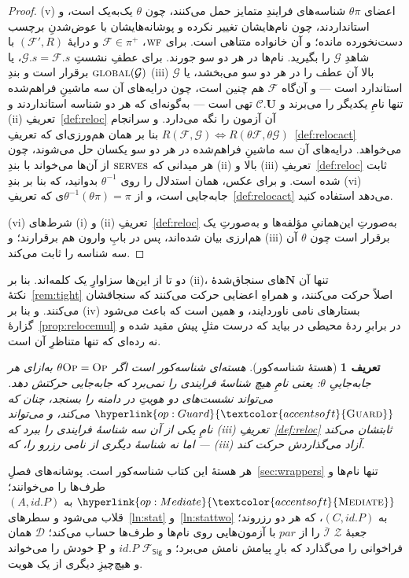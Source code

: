 \documentclass[10pt,oneside,openany]{book}
\newcommand{\Ps}{\mathbf{P}}
\newcommand{\admits}{\mathbf{N}}
\newcommand{\pars}{\mathit{par}}
\newcommand{\uses}{\mathbf{U}}
\newcommand{\serves}{\op{serves}}
\newcommand{\WF}{\op{wf}}
\newcommand{\Corr}{\mathcal{C}}
\newcommand{\F}{\mathcal{F}}
\newcommand{\G}{\mathcal{G}}
\newcommand{\Zenv}{\mathcal{Z}}
\newcommand{\Dum}{\mathcal{D}}
\newcommand{\op}[1]{\textnormal{\textsc{#1}}}
\newcommand{\opl}[1]{\hyperlink{op:#1}{\textcolor{accentsoft}{\op{#1}}}}
\newcommand{\Ids}{\mathcal{I}}
\newcommand{\id}{id}
\newcommand{\Fsig}{\mathcal{F}_{\mathsf{Sig}}}
\newcommand{\Op}{\op{Op}}
\theoremstyle{accentdef}
\newtheorem{definition}{تعریف}[chapter]
\theoremstyle{accentplain}
\begin{document}
\begin{proof}
(v) اعضای $\theta\pi$ شناسه‌های فرایندِ متمایز حمل می‌کنند، چون $\theta$
یک‌به‌یک است، و استانداردند، چون نام‌هایشان تغییر نکرده و پوشانه‌هایشان با
عوض‌شدنِ برچسب دست‌نخورده مانده؛ و آن خانواده متناهی است. برای $\WF$، $\F
\in \pi^{+}$ و درایهٔ $(\F',R)$ با شاهدِ $\G$ را بگیرید. نام‌ها در هر دو سو
جورند. برای عطفِ نشستِ $\G.s = \F.s$، یا $\op{global}(\G)$ برقرار است و بندِ
(iii)ِ بالا آن عطف را در هر دو سو می‌بخشد، یا $\G$ استاندارد است --- و
آن‌گاه $\F$ هم چنین است، چون درایه‌های آن سه ماشینِ فراهم‌شده تنها نامِ
یکدیگر را می‌برند و $\Corr.\uses$ تهی است --- به‌گونه‌ای که هر دو شناسه
استانداردند و (ii)ِ تعریفِ~\ref{def:reloc} آن آزمون را نگه می‌دارد. و
سرانجام $R(\F,\G) \iff R(\theta\F,\theta\G)$ بنا بر همان هم‌ورزی‌ای که
تعریفِ~\ref{def:relocact} می‌خواهد. درایه‌های آن سه ماشینِ فراهم‌شده در هر
دو سو یکسان حل می‌شوند، چون هر میدانی که $\serves$ از آن‌ها می‌خواند با بندِ
(ii)ِ بالا و (iii)ِ تعریفِ~\ref{def:reloc} ثابت شده است. و برای عکس، همان
استدلال را روی $\theta^{-1}$ بدوانید، که بنا بر بندِ (vi) جابه‌جایی است، و
از $\theta^{-1}(\theta\pi) = \pi$ی که تعریفِ~\ref{def:relocact} می‌دهد
استفاده کنید.

(vi) شرط‌های (i) و (ii)ِ تعریفِ~\ref{def:reloc} به‌صورتِ این‌همانیِ مؤلفه‌ها
و به‌صورتِ یک هم‌ارزی بیان شده‌اند، پس در بابِ وارون هم برقرارند؛ و (iii)
برقرار است چون $\theta$ آن سه شناسه را ثابت می‌کند.
\end{proof}

دو تا از این‌ها سزاوارِ یک کلمه‌اند. بنا بر (ii)، تنها آن $\admits$های
سنجاق‌شدهٔ نکتهٔ~\ref{rem:tight} اصلاً حرکت می‌کنند، و همراهِ اعضایی حرکت
می‌کنند که سنجاقشان می‌کنند. و بنا بر (iv) بستارهای نامی ناوردایند، و همین
است که باعث می‌شود گزارهٔ~\ref{prop:relocemul} در برابرِ ردهٔ محیطی در
بیاید که درست مثلِ پیش مقید شده و نه رده‌ای که تنها متناظرِ آن است.

\begin{definition}[هستهٔ شناسه‌کور]\label{def:pidblind}
هسته‌ای \emph{شناسه‌کور} است اگر $\theta\Op = \Op$ به‌ازای هر جابه‌جاییِ
$\theta$: یعنی نامِ هیچ شناسهٔ فرایندی را نمی‌برد که جابه‌جایی حرکتش دهد.
می‌تواند نشست‌های دو هویتِ در دامنه را بسنجد، چنان که $\opl{Guard}$
می‌کند، و می‌تواند نامِ یکی از آن سه شناسهٔ فرایندی را ببرد که (iii)ِ
تعریفِ~\ref{def:reloc} ثابتشان می‌کند --- اما نه شناسهٔ دیگری از نامی رزرو
را، که (iii) آزاد می‌گذاردش حرکت کند.
\end{definition}

هر هستهٔ این کتاب شناسه‌کور است. پوشانه‌های فصلِ~\ref{sec:wrappers} تنها
نام‌ها و طرف‌ها را می‌خوانند؛ $\opl{Mediate}$ به $(A,\id.P)$ قلاب می‌شود و
سطرهای~\ref{ln:stat} و~\ref{ln:stattwo} به $(C,\id.P)$، که هر دو رزروند؛
جعبهٔ $\Zenv$ $\overline{\Ids}$ را از $\pars$ با آزمون‌هایی روی نام‌ها و
طرف‌ها حساب می‌کند؛ $\Dum$ همان فراخوانی را می‌گذارد که بارِ پیامش نامش
می‌برد؛ و $\Fsig$ $\id.P$ و $\Ps$ِ خودش را می‌خواند و هیچ‌چیزِ دیگری از یک
هویت.
\end{document}
